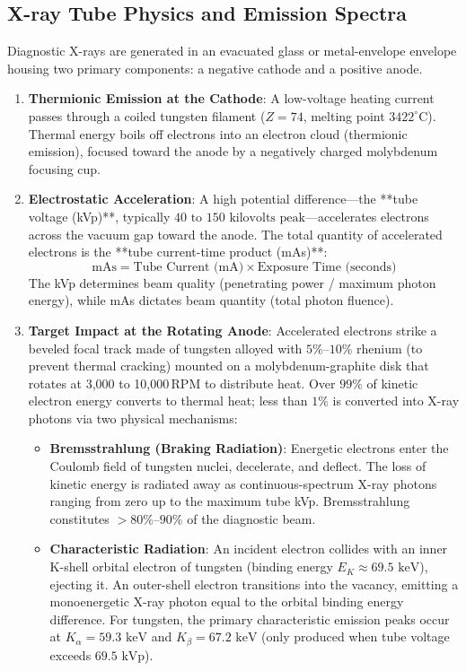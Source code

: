 \documentclass[11pt,a4paper]{article}
\begin{document}
\subsection{X-ray Tube Physics and Emission Spectra}
Diagnostic X-rays are generated in an evacuated glass or metal-envelope envelope housing two primary components: a negative cathode and a positive anode.
\begin{enumerate}[leftmargin=*]
    \item \textbf{Thermionic Emission at the Cathode}: A low-voltage heating current passes through a coiled tungsten filament ($Z=74$, melting point $3422^\circ\text{C}$). Thermal energy boils off electrons into an electron cloud (thermionic emission), focused toward the anode by a negatively charged molybdenum focusing cup.
    \item \textbf{Electrostatic Acceleration}: A high potential difference—the **tube voltage (kVp)**, typically $40\text{ to }150\text{ kilovolts peak}$—accelerates electrons across the vacuum gap toward the anode. The total quantity of accelerated electrons is the **tube current-time product (mAs)**:
    \begin{equation}
        \text{mAs} = \text{Tube Current (mA)} \times \text{Exposure Time (seconds)}
    \end{equation}
    The kVp determines beam quality (penetrating power / maximum photon energy), while mAs dictates beam quantity (total photon fluence).
    \item \textbf{Target Impact at the Rotating Anode}: Accelerated electrons strike a beveled focal track made of tungsten alloyed with $5\%\text{--}10\%$ rhenium (to prevent thermal cracking) mounted on a molybdenum-graphite disk that rotates at 3,000 to 10,000\,RPM to distribute heat. Over $99\%$ of kinetic electron energy converts to thermal heat; less than $1\%$ is converted into X-ray photons via two physical mechanisms:
    \begin{itemize}
        \item \textbf{Bremsstrahlung (Braking Radiation)}: Energetic electrons enter the Coulomb field of tungsten nuclei, decelerate, and deflect. The loss of kinetic energy is radiated away as continuous-spectrum X-ray photons ranging from zero up to the maximum tube kVp. Bremsstrahlung constitutes $>80\%\text{--}90\%$ of the diagnostic beam.
        \item \textbf{Characteristic Radiation}: An incident electron collides with an inner K-shell orbital electron of tungsten (binding energy $E_K \approx 69.5\text{ keV}$), ejecting it. An outer-shell electron transitions into the vacancy, emitting a monoenergetic X-ray photon equal to the orbital binding energy difference. For tungsten, the primary characteristic emission peaks occur at $K_\alpha = 59.3\text{ keV}$ and $K_\beta = 67.2\text{ keV}$ (only produced when tube voltage exceeds $69.5\text{ kVp}$).
    \end{itemize}
\end{enumerate}
\end{document}
